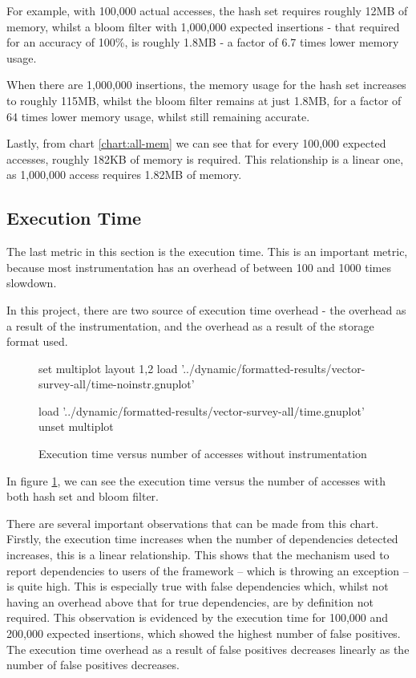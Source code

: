 	For example, with 100,000 actual accesses, the hash set requires roughly 12MB of memory, whilst a bloom filter with 1,000,000 expected insertions - that required for an accuracy of 100\%, is roughly 1.8MB - a factor of 6.7 times lower memory usage.
	
	When there are 1,000,000 insertions, the memory usage for the hash set increases to roughly 115MB, whilst the bloom filter remains at just 1.8MB, for a factor of 64 times lower memory usage, whilst still remaining accurate.
	
	Lastly, from chart \ref{chart:all-mem} we can see that for every 100,000 expected accesses, roughly 182KB of memory is required. This relationship is a linear one, as 1,000,000 access requires 1.82MB of memory.

	\subsection{Execution Time} \label{sec:results/all/time}
	The last metric in this section is the execution time. This is an important metric, because most instrumentation has an overhead of between 100 and 1000 times slowdown.
	
	In this project, there are two source of execution time overhead - the overhead as a result of the instrumentation, and the overhead as a result of the storage format used.
	
	\begin{figure}
		\centering
		\begin{gnuplot}[terminal=pdf]
			set multiplot layout 1,2
				load '../dynamic/formatted-results/vector-survey-all/time-noinstr.gnuplot'
			
				load '../dynamic/formatted-results/vector-survey-all/time.gnuplot'
			unset multiplot
		\end{gnuplot}
		\caption{Execution time versus number of accesses without instrumentation}
		\label{chart:all-time}
	\end{figure}
	
	In figure \ref{chart:all-time}, we can see the execution time versus the number of accesses with both hash set and bloom filter.
	
	There are several important observations that can be made from this chart. Firstly, the execution time increases when the number of dependencies detected increases, this is a linear relationship. This shows that the mechanism used to report dependencies to users of the framework -- which is throwing an exception -- is quite high. This is especially true with false dependencies which, whilst not having an overhead above that for true dependencies, are by definition not required. This observation is evidenced by the execution time for 100,000 and 200,000 expected insertions, which showed the highest number of false positives. The execution time overhead as a result of false positives decreases linearly as the number of false positives decreases.
	

